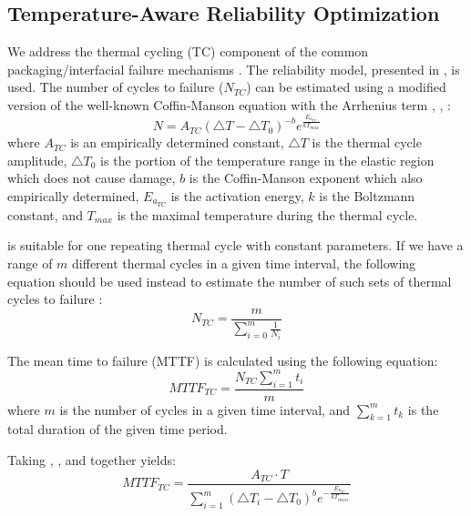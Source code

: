 \subsection{Temperature-Aware Reliability Optimization}
We address the thermal cycling (TC) component of the common packaging/interfacial failure mechanisms \cite{jedec2010}. The reliability model, presented in \cite{xiang2010}, is used. The number of cycles to failure ($N_{TC}$) can be estimated using a modified version of the well-known Coffin-Manson equation with the Arrhenius term \cite{jedec2010}, \cite{xiang2010}, \cite{ciappa2003}:
\begin{equation} \label{eq:number_of_cycles_to_failure}
  N = A_{TC} (\triangle T - \triangle T_0)^{-b} e^{\frac{E_{a_{TC}}}{k T_{max}}}
\end{equation}
where $A_{TC}$ is an empirically determined constant, $\triangle T$ is the thermal cycle amplitude, $\triangle T_0$ is the portion of the temperature range in the elastic region which does not cause damage, $b$ is the Coffin-Manson exponent which also empirically determined, $E_{a_{TC}}$ is the activation energy, $k$ is the Boltzmann constant, and $T_{max}$ is the maximal temperature during the thermal cycle.

 is suitable for one repeating thermal cycle with constant parameters. If we have a range of $m$ different thermal cycles in a given time interval, the following equation should be used instead to estimate the number of such sets of thermal cycles to failure \cite{xiang2010}:
\begin{equation} \label{eq:number_of_periods_to_failure}
  N_{TC} = \frac{m}{\sum_{i=0}^m \frac{1}{N_i}}
\end{equation}

The mean time to failure (MTTF) is calculated using the following equation:
\begin{equation} \label{eq:mttf}
  MTTF_{TC} = \frac{N_{TC} \sum_{i=1}^m t_i}{m}
\end{equation}
where $m$ is the number of cycles in a given time interval, and $\sum_{k=1}^m t_k$ is the total duration of the given time period.

Taking , , and  together yields:
\begin{equation}
  MTTF_{TC} = \frac{A_{TC} \cdot T}{\sum_{i=1}^m (\triangle T_i - \triangle T_0)^b e^{- \frac{E_{a_{TC}}}{k T_{max i}}}}
\end{equation}


